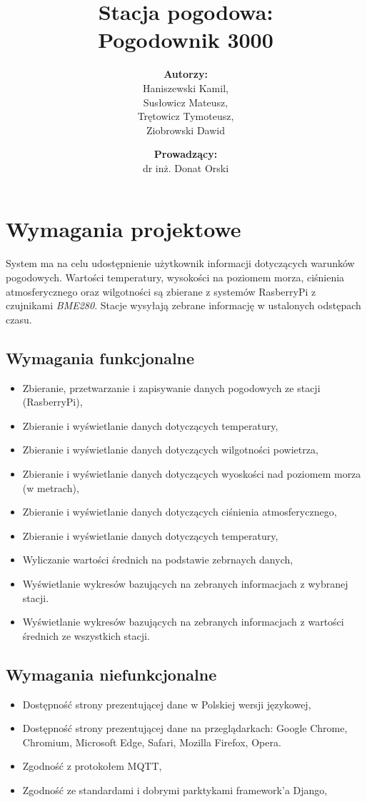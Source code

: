 \documentclass[12pt,a4paper]{article}
\title{\textbf{Stacja pogodowa}:\\ \textbf{Pogodownik 3000}}
\author{\textbf{Autorzy:} \\ Haniszewski Kamil,\\ Susłowicz Mateusz, \\ Trętowicz Tymoteusz, \\Ziobrowski Dawid}
\date{\textbf{Prowadzący:}\\ dr inż. Donat Orski}
\begin{document}
    \maketitle
    \pagebreak
    \tableofcontents
    \pagebreak
    \section{Wymagania projektowe}
    System ma na celu udostępnienie użytkownik informacji dotyczących warunków pogodowych. Wartości temperatury, wysokości na poziomem morza, ciśnienia atmosferycznego oraz wilgotności są zbierane z systemów RasberryPi z czujnikami \emph{BME280}. Stacje wysyłają zebrane informację w ustalonych odstępach czasu.
    \subsection{Wymagania funkcjonalne}
    \begin{itemize}
        \item Zbieranie, przetwarzanie i zapisywanie danych pogodowych ze stacji (RasberryPi),
        \item Zbieranie i wyświetlanie danych dotyczących temperatury,
        \item Zbieranie i wyświetlanie danych dotyczących wilgotności powietrza,
        \item Zbieranie i wyświetlanie danych dotyczących wyoskości nad poziomem morza (w metrach),
        \item Zbieranie i wyświetlanie danych dotyczących ciśnienia atmosferycznego,
        \item Zbieranie i wyświetlanie danych dotyczących temperatury,
        \item Wyliczanie wartości średnich na podstawie zebrnaych danych,
        \item Wyświetlanie wykresów bazujących na zebranych informacjach z wybranej stacji.
        \item Wyświetlanie wykresów bazujących na zebranych informacjach z wartości średnich ze wszystkich stacji.
    \end{itemize}
    \subsection{Wymagania niefunkcjonalne}
    \begin{itemize}
        \item Dostępność strony prezentującej dane w Polskiej wersji językowej,
        \item Dostępność strony prezentującej dane na przeglądarkach: Google Chrome, Chromium, Microsoft Edge, Safari, Mozilla Firefox, Opera.
        \item Zgodność z protokołem MQTT,
        \item Zgodność ze standardami i dobrymi parktykami framework'a Django,
    \end{itemize}
\end{document}
